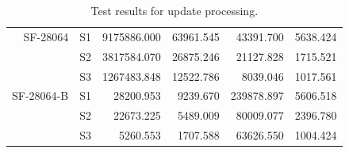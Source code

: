 \begin{table}[h]
\begin{tabular}{r|r|r|r|r|r}
\hline
SF-28064 & S1 & 9175886.000 & 63961.545 & 43391.700 & 5638.424 \\
 & S2 & 3817584.070 & 26875.246 & 21127.828 & 1715.521 \\
 & S3 & 1267483.848 & 12522.786 & 8039.046 & 1017.561 \\
\hline
SF-28064-B & S1 & 28200.953 & 9239.670 & 239878.897 & 5606.518 \\
 & S2 & 22673.225 & 5489.009 & 80009.077 & 2396.780 \\
 & S3 & 5260.553 & 1707.588 & 63626.550 & 1004.424 \\
	\hline
  \end{tabular}
  \caption{Test results for update processing.}
  \label{tab:testUpdateResults}
\end{table}

\renewcommand{\arraystretch}{1.5}
